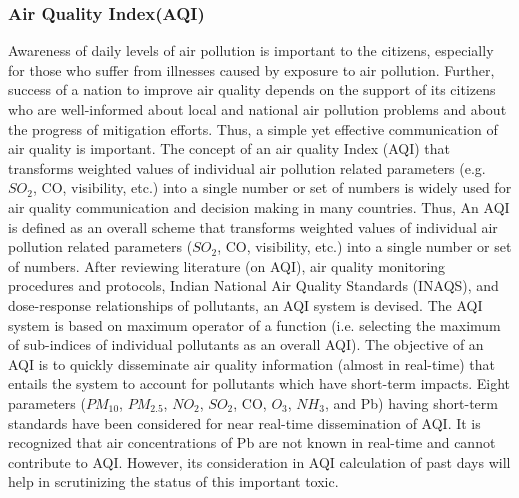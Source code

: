 \subsubsection{Air Quality Index(AQI)}
Awareness of daily levels of air pollution is important to the citizens, especially for those who suffer from illnesses caused by exposure to air pollution. Further, success of a nation to improve air quality depends on the support of its citizens who are well-informed about local and national air pollution problems and about the progress of mitigation efforts. Thus, a simple yet effective communication of air quality is important. The concept of an air quality Index (AQI) that transforms weighted values of individual air pollution related parameters (e.g. $SO_2$, CO, visibility, etc.) into a single number or set of numbers is widely used for air quality communication and decision making in many countries. Thus, An AQI is defined as an overall scheme that transforms weighted values of individual air pollution related parameters ($SO_2$, CO, visibility, etc.) into a single number or set of numbers. After reviewing literature (on AQI), air quality monitoring procedures and protocols, Indian National Air Quality Standards (INAQS), and dose-response relationships of pollutants, an AQI system is devised. The AQI system is based on maximum operator of a function (i.e. selecting the maximum of sub-indices of individual pollutants as an overall AQI). The objective of an AQI is to quickly disseminate air quality information (almost in real-time) that entails the system to account for pollutants which have short-term impacts. Eight parameters ($PM_{10}$, $PM_{2.5}$, $NO_2$, $SO_2$, CO, $O_3$, $NH_3$, and Pb) having short-term standards have been considered for near real-time dissemination of AQI. It is recognized that air concentrations of Pb are not known in real-time and cannot contribute to AQI. However, its consideration in AQI calculation of past days will help in scrutinizing the status of this important toxic. 